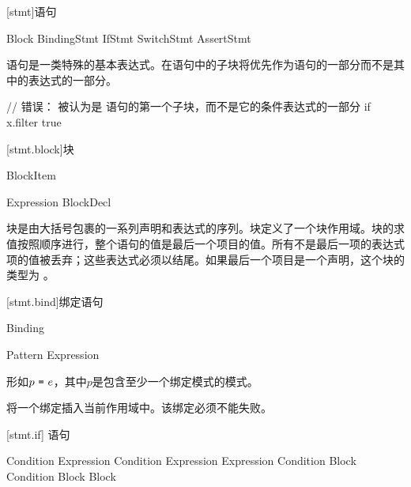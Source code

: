 
[stmt]{语句}

\begin{bnf}
 \br
    Block \br
    BindingStmt \br
    IfStmt \br
    SwitchStmt \br
    AssertStmt
\end{bnf}

\pnum
语句是一类特殊的基本表达式。在语句中的子块将优先作为语句的一部分而不是其中的表达式的一部分。\enterexample

\begin{codeblock}
// 错误：  被认为是  语句的第一个子块，而不是它的条件表达式的一部分
if x.filter{ true }
\end{codeblock}

\exitexample

[stmt.block]{块}

\begin{bnf}
 \br
    \terminal{\{} BlockItem\bnfs\ \terminal{\}}
\end{bnf}

\begin{bnf}
 \br
    Expression \terminal{;}\bnfq \br
    BlockDecl
\end{bnf}

\pnum
块是由大括号包裹的一系列声明和表达式的序列。块定义了一个块作用域。块的求值按照顺序进行，整个语句的值是最后一个项目的值。所有不是最后一项的表达式项的值被丢弃；这些表达式必须以\tcode{;}结尾。如果最后一个项目是一个声明，这个块的类型为 。

[stmt.bind]{绑定语句}

\begin{bnf}
 \br
    Binding \terminal{;}
\end{bnf}

\begin{bnf}
 \br
    Pattern \terminal{=} Expression \terminal{;}
\end{bnf}

\pnum
{}形如$p\ \tcode{=}\ e$，其中$p$是包含至少一个绑定模式的模式。

\pnum
{}将一个绑定插入当前作用域中。该绑定必须不能失败。

[stmt.if]{ 语句}

\begin{bnf}
 \br
     Condition  Expression \br
     Condition  Expression  Expression \br
     Condition Block \br
     Condition Block  Block
\end{bnf}

